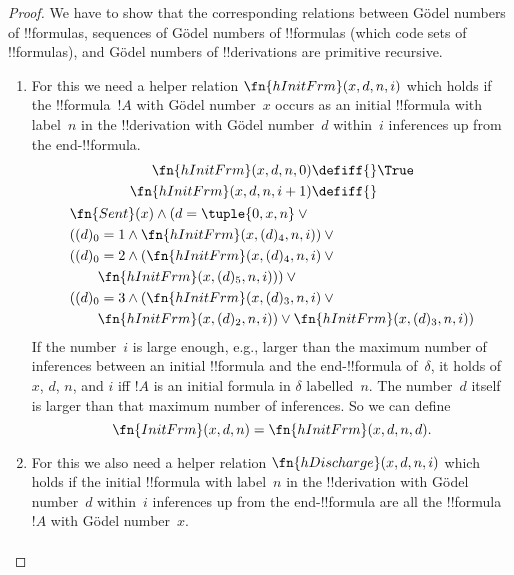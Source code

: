 \documentclass[../../../include/open-logic-section]{subfiles}
\begin{document}
\begin{proof}
We have to show that the corresponding relations between G\"odel
numbers of !!{formula}s, sequences of G\"odel numbers of !!{formula}s
(which code sets of !!{formula}s), and G\"odel numbers of !!{derivation}s 
are primitive recursive.
\begin{enumerate}
\item For this we need a helper relation $\fn{hInitFrm}(x, d, n, i)$
  which holds if the !!{formula}~$!A$ with G\"odel number~$x$ occurs
  as an initial !!{formula} with label~$n$ in the !!{derivation} with
  G\"odel number~$d$ within~$i$ inferences up from the
  end-!!{formula}.
  \begin{multline*}
    \begin{aligned}
    \fn{hInitFrm}(x, d, n, 0) \defiff {} & \True\\   
    \fn{hInitFrm}(x, d, n, i+1) \defiff {} &
    \end{aligned}\\
    \begin{aligned}
&  \fn{Sent}(x) \land (d = \tuple{0, x, n} \lor {}\\
      & ((d)_0 = 1 \land \fn{hInitFrm}(x, (d)_4, n, i)) \lor {}\\
      & ((d)_0 = 2 \land (\fn{hInitFrm}(x, (d)_4, n, i) \lor {}\\
      & \qquad\fn{hInitFrm}(x, (d)_5, n, i))) \lor {}\\
      & ((d)_0 = 3 \land (\fn{hInitFrm}(x, (d)_3, n, i) \lor {}\\
      & \qquad \fn{hInitFrm}(x, (d)_2, n, i)) \lor
      \fn{hInitFrm}(x, (d)_3, n, i))
\end{aligned}
  \end{multline*}
   If the number~$i$ is large enough, e.g., larger than the maximum
   number of inferences between an initial !!{formula} and the
   end-!!{formula} of~$\delta$, it holds of $x$, $d$, $n$, and $i$ iff
   $!A$ is an initial formula in $\delta$ labelled~$n$.  The
   number~$d$ itself is larger than that maximum number of inferences.
   So we can define
   \[
   \fn{InitFrm}(x, d, n) = \fn{hInitFrm}(x, d, n, d).
   \]
\item For this we also need a helper relation $\fn{hDischarge}(x, d,
  n, i)$ which holds if the initial !!{formula} with label~$n$ in the
  !!{derivation} with G\"odel number~$d$ within~$i$ inferences up from
  the end-!!{formula} are all the !!{formula}~$!A$ with G\"odel
  number~$x$.
  \begin{multline*}

\end{multline*}
\end{enumerate}
\end{proof}
\end{document}

